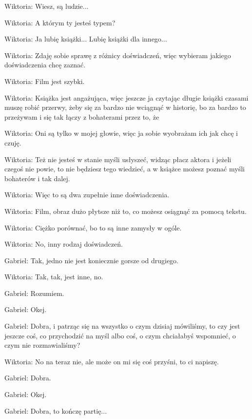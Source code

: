 Wiktoria: Wiesz, są ludzie...

Wiktoria: A którym ty jesteś typem?

Wiktoria: Ja lubię książki... Lubię książki dla innego...

Wiktoria: Zdaję sobie sprawę z różnicy doświadczeń, więc wybieram jakiego doświadczenia chcę zaznać.

Wiktoria: Film jest szybki.

Wiktoria: Książka jest angażująca, więc jeszcze ja czytając długie książki czasami muszę robić przerwy, żeby się za bardzo nie wciągnąć w historię, bo za bardzo to przeżywam i się tak łączy z bohaterami przez to, że

Wiktoria: Oni są tylko w mojej głowie, więc ja sobie wyobrażam ich jak chcę i czuję.

Wiktoria: Też nie jesteś w stanie myśli usłyszeć, widząc płacz aktora i jeżeli czegoś nie powie, to nie będziesz tego wiedzieć, a w książce możesz poznać myśli bohaterów i tak dalej.

Wiktoria: Więc to są dwa zupełnie inne doświadczenia.

Wiktoria: Film, obraz dużo płytsze niż to, co możesz osiągnąć za pomocą tekstu.

Wiktoria: Ciężko porównać, bo to są inne zamysły w ogóle.

Wiktoria: No, inny rodzaj doświadczeń.

Gabriel: Tak, jedno nie jest koniecznie gorsze od drugiego.

Wiktoria: Tak, tak, jest inne, no.

Gabriel: Rozumiem.

Gabriel: Okej.

Gabriel: Dobra, i patrząc się na wszystko o czym dzisiaj mówiliśmy, to czy jest jeszcze coś, co przychodzić na myśl albo coś, o czym chciałabyś wspomnieć, o czym nie rozmawialiśmy?

Wiktoria: No na teraz nie, ale może on mi się coś przyśni, to ci napiszę.

Gabriel: Dobra.

Gabriel: Okej.

Gabriel: Dobra, to kończę partię...

